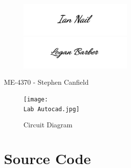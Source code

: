 \documentclass[a4paper,12pt]{article} %
\begin{document}
\maketitle %
\vspace{3cm}

\begin{figure}[h!]
\centering
    \includegraphics[width=0.5\textwidth]{IANsignature.png}
    \includegraphics[width=0.5\textwidth]{LOGANsignature.png}
  \end{figure}
\begin{center}
\vspace{3cm}
ME-4370 - Stephen Canfield
\end{center}
\pagebreak



\begin{figure}[h!]
\centering
    \texttt{[image: \\Lab Autocad.jpg]}
    \caption{Circuit Diagram}
  \end{figure}

\clearpage
\section{Source Code} %
\vspace{5mm}
\linespread{1}

\linespread{1.6}
\vspace{5mm}
\end{document}

